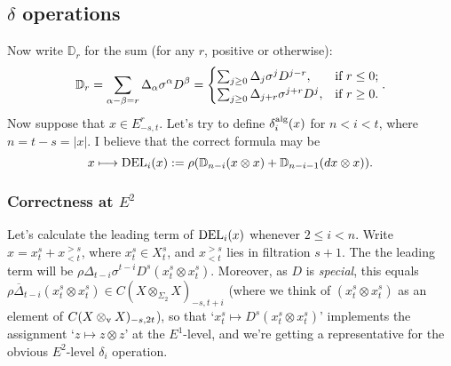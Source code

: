 \documentclass[10pt]{article}
\newcommand{\twist}{\sigma}
\begin{document}
\begin{letter to Dwyer}
\subsection{$\delta$ operations}

Now write $\mathbb{D}_r$ for the sum (for any $r$, positive or otherwise):
\[\mathbb{D}_r=\sum_{\alpha-\beta=r}\Delta_\alpha\twist^\alpha D^\beta=\begin{cases}
\sum_{j\geq0}\Delta_{j}\twist^{j}D^{j-r},&\textup{if }r\leq0;\\
\sum_{j\geq0}\Delta_{j+r}\twist^{j+r}D^{j},&\textup{if }r\geq0.
\end{cases}
.\]
Now suppose that $x\in E^r_{-s,t}$. Let's try to define $\delta_i^\textup{alg}(x)$ for $n<i<t$, where $n=t-s=|x|$. I believe that the correct formula may be
\[x\mapsto \textup{DEL}_{i}(x):=\rho(\mathbb{D}_{n-i}(x\otimes x)+\mathbb{D}_{n-i-1}(dx\otimes x)).\]
\subsubsection*{Correctness at $E^2$}
Let's calculate the leading term of $\textup{DEL}_{i}(x)$ whenever $2\leq i<n$. Write $x=x^s_t+x^{>s}_{<t}$, where $x^s_t\in X^s_t$, and $x^{>s}_{<t}$ lies in filtration $s+1$. The the leading term will be $\rho\Delta_{t-i}\twist^{t-i}D^s (x^s_t\otimes x^s_t)$. Moreover, as $D$ is \emph{special}, this equals $\rho\overline{\Delta}_{t-i}(x^s_t\otimes x^s_t)\in C(X\otimes_{\Sigma_2} X)_{-s,t+i}$ (where we think of $(x^s_t\otimes x^s_t)$ as an element of $C(X\otimes_\textup{v}X)_{-s,2t}$), so that `$x^s_t\mapsto D^s(x^s_t\otimes x^s_t)$' implements the assignment `$z\mapsto z\otimes z$' at the $E^1$-level, and we're getting a representative for the obvious $E^2$-level $\delta_i$ operation.

\newcommand{\twolinesum}[2]{\mathop{\sum_{\mathclap{#1}}}_{\mathclap{#2}}}
\newcommand{\onelinesum}[1]{\sum_{\mathclap{#1}}}

\end{letter to Dwyer}
\end{document}
